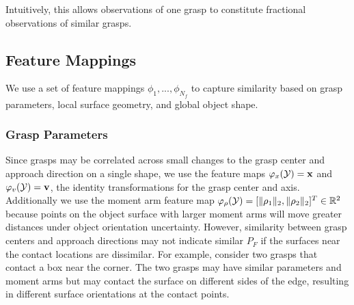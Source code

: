 \noindent Intuitively, this allows observations of one grasp to constitute fractional observations of similar grasps.

\subsection{Feature Mappings}
We use a set of feature mappings $\phi_1, ..., \phi_{N_f}$ to capture similarity based on grasp parameters, local surface geometry, and global object shape.

\subsubsection{Grasp Parameters}
Since grasps may be correlated across small changes to the grasp center and approach direction on a single shape, we use the feature maps $\varphi_{x}(\mathcal{Y}) = \mathbf{x}$ and $\varphi_{v}(\mathcal{Y}) = \mathbf{v}$, the identity transformations for the grasp center and axis.
Additionally we use the moment arm feature map $\varphi_{\rho}(\mathcal{Y}) = [ \| \rho_1 \|_2, \| \rho_2 \|_2]^T \in \mathbb{R}^2$ because points on the object surface with larger moment arms will move greater distances under object orientation uncertainty.
However, similarity between grasp centers and approach directions may not indicate similar $P_F$ if the surfaces near the contact locations are dissimilar.
For example, consider two grasps that contact a box near the corner.
The two grasps may have similar parameters and moment arms but may contact the surface on different sides of the edge, resulting in different surface orientations at the contact points.

